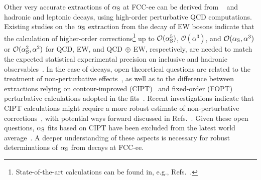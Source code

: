 Other very accurate extractions of $\alpha_{\rm S}$ at FCC-ee can be derived from 
\PGt~\cite{Pich:2016bdg,Boito:2016oam} and \PW~\cite{dEnterria:2016rbf,dEnterria:2020cpv} hadronic and leptonic decays, 
using high-order perturbative QCD computations. 
Existing studies on the $\alpha_{\rm S}$ extraction from the decay of EW bosons indicate that 
the calculation of higher-order corrections\footnote{State-of-the-art calculations can be found in, e.g., 
Refs.~\cite{Baikov:2008jh, Baikov:2012er, Freitas:2014hra, Freitas:2013dpa, Chen:2020xzx, Dubovyk:2019szj}.}
up to $\mathcal{O}(\alpha_{\rm S}^5)$, $\mathcal{O}(\alpha^3)$, and $\mathcal{O}(\alpha_{\rm S},\alpha^3)$ or $\mathcal{O}(\alpha_{\rm S}^2,\alpha^2)$ 
for QCD, EW, and QCD$\,\oplus\,$EW, respectively,
are needed to match the expected statistical experimental precision on inclusive \PW and \PZ hadronic observables~\cite{dEnterria:2020cpv}.
In the case of \PGt decays, 
open theoretical questions are related to the treatment of non-perturbative effects~\cite{Pich:2013lsa,Davier:2013sfa,Boito:2014sta}, 
as well as to the difference between extractions relying on contour-improved (CIPT)~\cite{Pivovarov:1991rh,LeDiberder:1992jjr} 
and fixed-order (FOPT) perturbative calculations adopted in the fits~\cite{Hoang:2021nlz,Benitez-Rathgeb:2021gvw}.
Recent investigations indicate that CIPT calculations might require a more robust estimate of 
non-perturbative corrections~\cite{Hoang:2020mkw,Hoang:2021nlz,Golterman:2023oml}, 
with potential ways forward discussed in Refs.~\cite{Benitez-Rathgeb:2022hfj,Benitez-Rathgeb:2022yqb}. 
Given these open questions, $\alpha_{\rm S}$ fits based on CIPT have been excluded from the latest world average~\cite{ParticleDataGroup:2024cfk}.
A deeper understanding of these aspects is necessary for robust determinations of $\alpha_{\rm S}$ from \PGt decays at FCC-ee.

